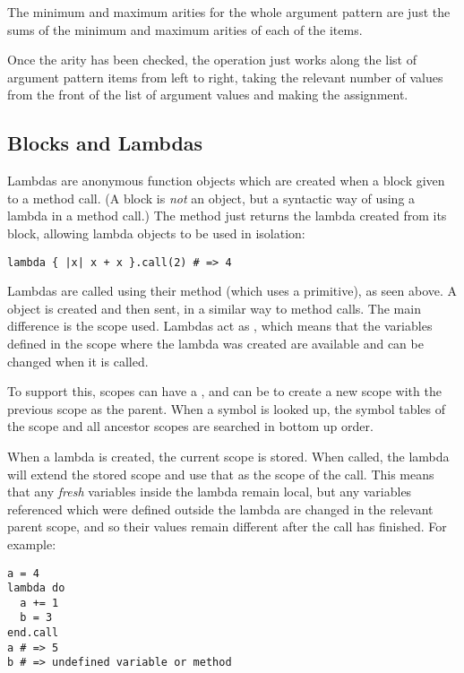 The minimum and maximum arities for the whole argument pattern are just the sums of the minimum and maximum arities of each of the items.

Once the arity has been checked, the  operation just works along the list of argument pattern items from left to right, taking the relevant number of values from the front of the list of argument values and making the assignment.

\subsection{Blocks and Lambdas}

Lambdas are anonymous function objects which are created when a block given to a method call. (A block is \textit{not} an object, but a syntactic way of using a lambda in a method call.) The  method just returns the lambda created from its block, allowing lambda objects to be used in isolation:

\begin{lstlisting}
lambda { |x| x + x }.call(2) # => 4
\end{lstlisting}

Lambdas are called using their  method (which uses a primitive), as seen above. A  object is created and then sent, in a similar way to method calls. The main difference is the scope used. Lambdas act as , which means that the variables defined in the scope where the lambda was created are available and can be changed when it is called.

To support this, scopes can have a , and can be  to create a new scope with the previous scope as the parent. When a symbol is looked up, the symbol tables of the scope and all ancestor scopes are searched in bottom up order.

When a lambda is created, the current scope is stored. When called, the lambda will extend the stored scope and use that as the scope of the call. This means that any \textit{fresh} variables inside the lambda remain local, but any variables referenced which were defined outside the lambda are changed in the relevant parent scope, and so their values remain different after the call has finished. For example:

\begin{lstlisting}
a = 4
lambda do
  a += 1
  b = 3
end.call
a # => 5
b # => undefined variable or method
\end{lstlisting}

